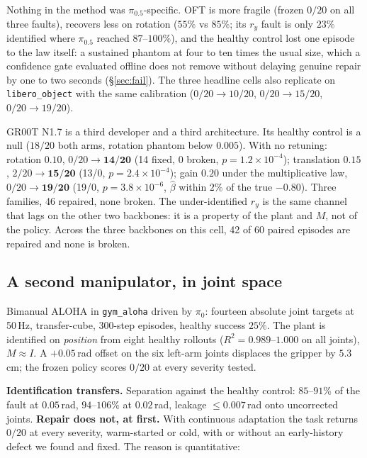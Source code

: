 \documentclass{article}
\newcommand{\code}[1]{\texttt{\small #1}}
\begin{document}
Nothing in the method was $\pi_{0.5}$-specific. OFT is more fragile (frozen $0/20$ on all
three faults), recovers less on rotation ($55\%$ vs $85\%$; its $r_y$ fault is only $23\%$
identified where $\pi_{0.5}$ reached $87$--$100\%$), and the healthy control lost one episode
to the law itself: a sustained phantom at four to ten times the usual size, which a
confidence gate evaluated offline does not remove without delaying genuine repair by one to
two seconds (\S\ref{sec:fail}). The three headline cells also replicate on
\code{libero\_object} with the same calibration ($0/20\to10/20$, $0/20\to15/20$,
$0/20\to19/20$).

GR00T N1.7 is a third developer and a third architecture. Its healthy control is a null
($18/20$ both arms, rotation phantom below $0.005$). With no retuning: rotation $0.10$,
$0/20\to\mathbf{14/20}$ (14 fixed, 0 broken, $p=1.2\times10^{-4}$); translation $0.15$,
$2/20\to\mathbf{15/20}$ (13/0, $p=2.4\times10^{-4}$); gain $0.20$ under the multiplicative
law, $0/20\to\mathbf{19/20}$ (19/0, $p=3.8\times10^{-6}$, $\hat\beta$ within $2\%$ of the
true $-0.80$). Three families, 46 repaired, none broken. The under-identified $r_y$ is the same channel that lags on the other two
backbones: it is a property of the plant and $M$, not of the policy. Across the three
backbones on this cell, 42 of 60 paired episodes are repaired and none is broken.

\subsection{A second manipulator, in joint space}
\label{sec:aloha}

Bimanual ALOHA in \code{gym\_aloha} driven by $\pi_0$: fourteen absolute joint targets at
50\,Hz, transfer-cube, 300-step episodes, healthy success $25\%$. The plant is identified on
\emph{position} from eight healthy rollouts ($R^2 = 0.989$--$1.000$ on all joints),
$M\approx I$. A $+0.05$\,rad offset on the six left-arm joints displaces the gripper by
$5.3$\,cm; the frozen policy scores $0/20$ at every severity tested.

\textbf{Identification transfers.} Separation against the healthy control: $85$--$91\%$ of
the fault at $0.05$\,rad, $94$--$106\%$ at $0.02$\,rad, leakage $\le0.007$\,rad onto
uncorrected joints. \textbf{Repair does not, at first.} With continuous adaptation the task
returns $0/20$ at every severity, warm-started or cold, with or without an early-history
defect we found and fixed. The reason is quantitative:
\end{document}
